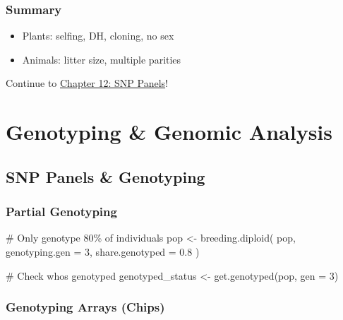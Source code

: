 \documentclass[
  letterpaper,
]{book}
\newenvironment{Shaded}{\begin{snugshade}}{\end{snugshade}}
\newcommand{\AttributeTok}[1]{\textcolor[rgb]{0.40,0.45,0.13}{#1}}
\newcommand{\CommentTok}[1]{\textcolor[rgb]{0.37,0.37,0.37}{#1}}
\newcommand{\DecValTok}[1]{\textcolor[rgb]{0.68,0.00,0.00}{#1}}
\newcommand{\FloatTok}[1]{\textcolor[rgb]{0.68,0.00,0.00}{#1}}
\newcommand{\FunctionTok}[1]{\textcolor[rgb]{0.28,0.35,0.67}{#1}}
\newcommand{\NormalTok}[1]{\textcolor[rgb]{0.00,0.23,0.31}{#1}}
\newcommand{\OtherTok}[1]{\textcolor[rgb]{0.00,0.23,0.31}{#1}}
\providecommand{\tightlist}{%
  \setlength{\itemsep}{0pt}\setlength{\parskip}{0pt}}
\begin{document}
\section{Summary}\label{summary-10}

\begin{itemize}
\tightlist
\item
  Plants: selfing, DH, cloning, no sex
\item
  Animals: litter size, multiple parities
\end{itemize}

Continue to \href{12-snp-panels.qmd}{Chapter 12: SNP Panels}!

\part{Genotyping \& Genomic Analysis}

\chapter{SNP Panels \& Genotyping}\label{sec-snp-panels}

\section{Partial Genotyping}\label{partial-genotyping}

\begin{Shaded}
\begin{Highlighting}[]
\CommentTok{\# Only genotype 80\% of individuals}
\NormalTok{pop }\OtherTok{\textless{}{-}} \FunctionTok{breeding.diploid}\NormalTok{(}
\NormalTok{  pop,}
  \AttributeTok{genotyping.gen =} \DecValTok{3}\NormalTok{,}
  \AttributeTok{share.genotyped =} \FloatTok{0.8}
\NormalTok{)}

\CommentTok{\# Check who\textquotesingle{}s genotyped}
\NormalTok{genotyped\_status }\OtherTok{\textless{}{-}} \FunctionTok{get.genotyped}\NormalTok{(pop, }\AttributeTok{gen =} \DecValTok{3}\NormalTok{)}
\end{Highlighting}
\end{Shaded}

\section{Genotyping Arrays (Chips)}\label{genotyping-arrays-chips}
\end{document}
